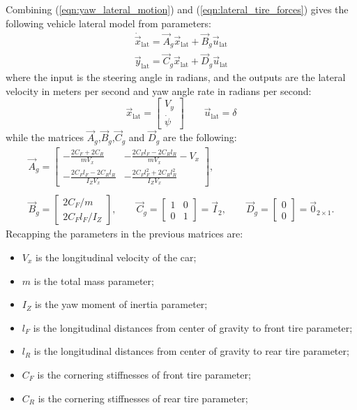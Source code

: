 Combining (\ref{eqn:yaw_lateral_motion}) and (\ref{eqn:lateral_tire_forces}) gives the following vehicle lateral model from parameters: 
\begin{equation}
\label{eqn:lateral_dynamics_simple_model}
\begin{array}{ll}
\dot{\vec{x}}_{\text{lat}} =\vec{A}_g \vec{x}_{\text{lat}}+ \vec{B}_g \vec{u}_{\text{lat}}\\
\vec{y}_{\text{lat}} =\vec{C}_g \vec{x}_{\text{lat}} + \vec{D}_g \vec{u}_{\text{lat}}
\end{array}
\end{equation}
where the input is the steering angle in radians, and the outputs are the lateral velocity in meters per second and yaw angle rate in radians per second:
\begin{equation}
\vec{x}_{\text{lat}} = \begin{bmatrix}
V_y\\\dot{\psi}
\end{bmatrix}
\qquad
\vec{u}_{\text{lat}} = \delta
\end{equation}
while the matrices $\vec{A}_g$,$\vec{B}_g$,$\vec{C}_g$ and $\vec{D}_g$ are the following:
\begin{equation}
\begin{array}{cc}
\vec{A}_g=
\begin{bmatrix}
\displaystyle -\frac{2C_F+2C_R}{mV_x}&\displaystyle -\frac{2C_Fl_F-2C_Rl_R}{mV_x} - V_x\\
\displaystyle -\frac{2C_Fl_F-2C_Rl_R}{I_ZV_x}&\displaystyle -\frac{2C_Fl_F^2+2C_Rl_R^2}{I_ZV_x}
\end{bmatrix},
\\\\
\vec{B}_g=\begin{bmatrix}
2C_F/m\\2C_Fl_F/I_Z
\end{bmatrix},
\qquad
\vec{C}_g=\begin{bmatrix}
1&0\\0&1
\end{bmatrix}=
\vec{I}_2, 
\qquad
\vec{D}_g=\begin{bmatrix}
0\\0
\end{bmatrix}=
\vec{0}_{2\times1}.
\end{array}
\end{equation}
Recapping the parameters in the previous matrices are:
\begin{itemize}
	\item $V_x$ is the longitudinal velocity of the car;	
	\item $m$ is the total mass parameter; 
	\item $I_Z$ is the yaw moment of inertia parameter;
	\item $l_F$ is the longitudinal distances from center of gravity to front tire parameter;
	\item $l_R$ is the longitudinal distances from center of gravity to rear tire parameter;
	\item $C_F$ is the cornering stiffnesses of front tire parameter;
	\item $C_R$ is the cornering stiffnesses of rear tire parameter;
\end{itemize}
